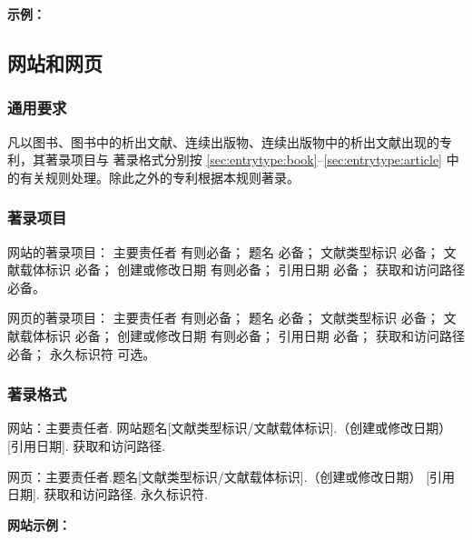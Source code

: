 \documentclass[twoside]{article}%
\begin{document}
\begin{refsection}

\nocite{邓一刚2006--,张凯军2012-04-05--,李华2023,
西安电子科技大学2002--,河北绿洲生态环境科技有限公司2001--,
苏州生物2022,Tachibana2005--,TRISCO2022,中国焊接协会2023}



{

\textbf{示例：}

{\printbibliography[heading=none,env=indentegenv]}
}
\end{refsection}

\subsection{网站和网页}

\subsubsection{通用要求}

凡以图书、图书中的析出文献、连续出版物、连续出版物中的析出文献出现的专利，其著录项目与
著录格式分别按 \ref{sec:entrytype:book}--\ref{sec:entrytype:article} 中的有关规则处理。除此之外的专利根据本规则著录。

\subsubsection{著录项目}

网站的著录项目：
主要责任者 有则必备；
题名 必备；
文献类型标识 必备；
文献载体标识 必备；
创建或修改日期 有则必备；
引用日期 必备；
获取和访问路径 必备。

网页的著录项目：
主要责任者 有则必备；
题名 必备；
文献类型标识 必备；
文献载体标识 必备；
创建或修改日期 有则必备；
引用日期 必备；
获取和访问路径 必备；
永久标识符 可选。

\subsubsection{著录格式}

网站：主要责任者. 网站题名[文献类型标识/文献载体标识].（创建或修改日期） [引用日期]. 获取和访问路径.

网页：主要责任者.题名[文献类型标识/文献载体标识].（创建或修改日期） [引用日期]. 获取和访问路径. 永久标识符.


\begin{refsection}

\nocite{鲁迅博物馆2023,
BBC2020a,
BBC2020b}


{


\textbf{网站示例：}

{\printbibliography[heading=none,env=indentegenv]}
}
\end{refsection}
\end{document}
